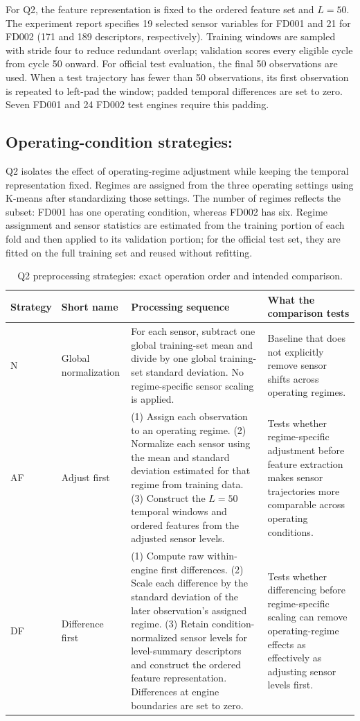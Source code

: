 \documentclass[10pt,a4paper]{article}
\begin{document}
For Q2, the feature representation is fixed to the ordered feature set and $L=50$. The experiment report specifies 19 selected sensor variables for FD001 and 21 for FD002 (171 and 189 descriptors, respectively). Training windows are sampled with stride four to reduce redundant overlap; validation scores every eligible cycle from cycle 50 onward. For official test evaluation, the final 50 observations are used. When a test trajectory has fewer than 50 observations, its first observation is repeated to left-pad the window; padded temporal differences are set to zero. Seven FD001 and 24 FD002 test engines require this padding.

\subsection{Operating-condition strategies:}
Q2 isolates the effect of operating-regime adjustment while keeping the temporal representation fixed. Regimes are assigned from the three operating settings using K-means after standardizing those settings. The number of regimes reflects the subset: FD001 has one operating condition, whereas FD002 has six. Regime assignment and sensor statistics are estimated from the training portion of each fold and then applied to its validation portion; for the official test set, they are fitted on the full training set and reused without refitting.

\begin{table}[H]\centering\small
\caption{Q2 preprocessing strategies: exact operation order and intended comparison.}
\begin{tabularx}{\linewidth}{@{}l l Y Y@{}}\toprule
Strategy & Short name & Processing sequence & What the comparison tests\\\midrule
N & Global normalization & For each sensor, subtract one global training-set mean and divide by one global training-set standard deviation. No regime-specific sensor scaling is applied. & Baseline that does not explicitly remove sensor shifts across operating regimes.\\
AF & Adjust first & (1) Assign each observation to an operating regime. (2) Normalize each sensor using the mean and standard deviation estimated for that regime from training data. (3) Construct the $L=50$ temporal windows and ordered features from the adjusted sensor levels. & Tests whether regime-specific adjustment before feature extraction makes sensor trajectories more comparable across operating conditions.\\
DF & Difference first & (1) Compute raw within-engine first differences. (2) Scale each difference by the standard deviation of the later observation's assigned regime. (3) Retain condition-normalized sensor levels for level-summary descriptors and construct the ordered feature representation. Differences at engine boundaries are set to zero. & Tests whether differencing before regime-specific scaling can remove operating-regime effects as effectively as adjusting sensor levels first.\\\bottomrule
\end{tabularx}
\end{table}
\end{document}
